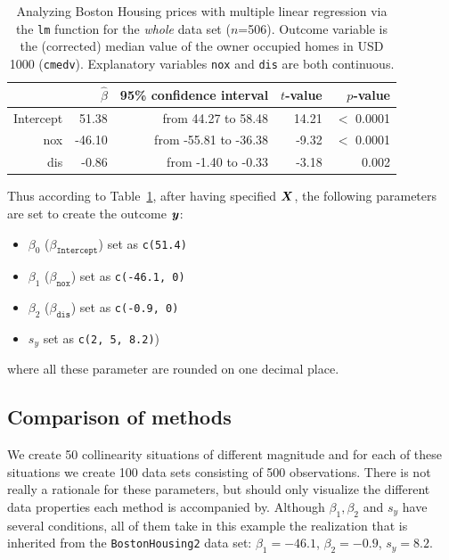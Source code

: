 \documentclass[11pt,a4paper,twoside]{book}\usepackage[]{graphicx}\usepackage[]{xcolor}
\begin{document}
\begin{table}[H]
\begin{center}
\caption{Analyzing Boston Housing prices with multiple linear regression via the \texttt{lm} function for the \textit{whole} data set ($n$=506). Outcome variable is the (corrected) median value of the owner occupied homes in USD 1000 (\texttt{cmedv}). Explanatory variables \texttt{nox} and \texttt{dis} are both continuous.}\label{tab:bost_log}
\begingroup\footnotesize
\begin{tabular}{rrrrr}
  \toprule
 & $\hat\beta$ & 95\% confidence interval & $t$-value & $p$-value \\ 
  \midrule
Intercept & 51.38 & from 44.27 to 58.48 & 14.21 & $<$ 0.0001 \\ 
  nox & -46.10 & from -55.81 to -36.38 & -9.32 & $<$ 0.0001 \\ 
  dis & -0.86 & from -1.40 to -0.33 & -3.18 & 0.002 \\ 
   \bottomrule
\end{tabular}
\endgroup

\end{center}
\end{table}

Thus according to Table~\ref{tab:bost_log}, after having specified ${\boldsymbol{X}}$, the following parameters are set to create the outcome ${\textbf{\textit{y}}}$:
\begin{multicols}{2}
\begin{itemize}
\item $\beta_0$ ($\beta_\texttt{Intercept}$) set as \texttt{c(51.4)}
\item $\beta_1$ ($\beta_\texttt{nox}$) set as \texttt{c(-46.1, 0)}
\item $\beta_2$ ($\beta_\texttt{dis}$) set as \texttt{c(-0.9, 0)}
\item $s_y$ set as \texttt{c(2, 5, 8.2)})
\end{itemize}
\end{multicols}

where all these parameter are rounded on one decimal place.

\newpage
\subsection{Comparison of methods}

We create 50 collinearity situations of different magnitude and for each of these situations we create 100 data sets consisting of 500 observations. There is not really a rationale for these parameters, but should only visualize the different data properties each method is accompanied by. Although $\beta_1, \beta_2$ and $s_y$ have several conditions, all of them take in this example the realization that is inherited from the \texttt{BostonHousing2} data set: $\beta_1=-46.1$, $\beta_2=-0.9$, $s_y=8.2$.
\end{document}
